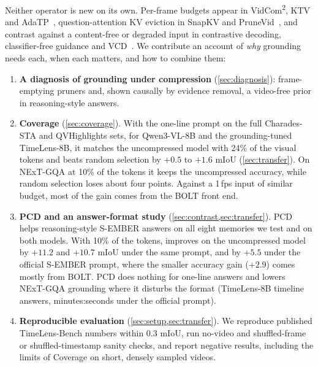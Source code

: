 Neither operator is new on its own. Per-frame budgets appear in VidCom\textsuperscript{2}, KTV and
AdaTP~\cite{vidcom2,ktv,adatp}, question-attention KV eviction in SnapKV and PruneVid~\cite{snapkv,prunevid}, and
contrast against a content-free or degraded input in contrastive decoding, classifier-free guidance and
VCD~\cite{contrastivedecoding,cfglm,cad,vcd,m3id}. We contribute an account of \emph{why} grounding needs each, when
each matters, and how to combine them:
\begin{enumerate}
  \item \textbf{A diagnosis of grounding under compression} (\cref{sec:diagnosis}): frame-emptying pruners and,
  shown causally by evidence removal, a video-free prior in reasoning-style answers.
  \item \textbf{Coverage} (\cref{sec:coverage}). With the one-line prompt on the full Charades-STA and QVHighlights
  sets, for Qwen3-VL-8B and the grounding-tuned TimeLens-8B, it matches the uncompressed model with 24\% of the visual
  tokens and beats random selection by $+0.5$ to $+1.6$ mIoU (\cref{sec:transfer}). On NExT-GQA at 10\% of the tokens
  it keeps the uncompressed accuracy, while random selection loses about four points. Against a 1\,fps input of
  similar budget, most of the gain comes from the BOLT front end.
  \item \textbf{PCD and an answer-format study} (\cref{sec:contrast,sec:transfer}). PCD helps reasoning-style
  S-EMBER answers on all eight memories we test and on both models. With 10\% of the tokens, \method improves on the
  uncompressed model by $+11.2$ and $+10.7$ mIoU under the same prompt, and by $+5.5$ under the official S-EMBER
  prompt, where the smaller accuracy gain ($+2.9$) comes mostly from BOLT. PCD does nothing for one-line answers and
  lowers NExT-GQA grounding where it disturbs the format (TimeLens-8B timeline answers, minutes:seconds under the
  official prompt).
  \item \textbf{Reproducible evaluation} (\cref{sec:setup,sec:transfer}). We reproduce published TimeLens-Bench
  numbers within 0.3 mIoU, run no-video and shuffled-frame or shuffled-timestamp sanity checks, and report negative
  results, including the limits of Coverage on short, densely sampled videos.
\end{enumerate}
